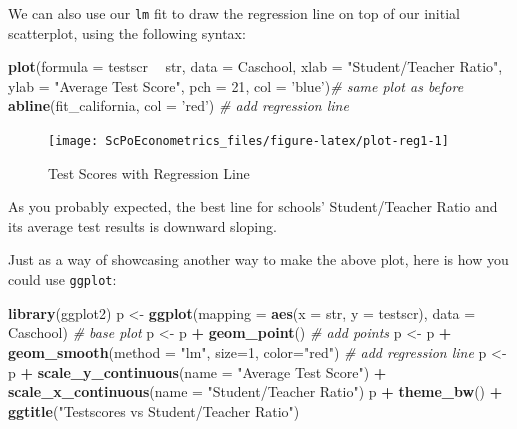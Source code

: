 \documentclass[]{book}
\newenvironment{Shaded}{\begin{snugshade}}{\end{snugshade}}
\newcommand{\KeywordTok}[1]{\textcolor[rgb]{0.13,0.29,0.53}{\textbf{#1}}}
\newcommand{\DataTypeTok}[1]{\textcolor[rgb]{0.13,0.29,0.53}{#1}}
\newcommand{\DecValTok}[1]{\textcolor[rgb]{0.00,0.00,0.81}{#1}}
\newcommand{\StringTok}[1]{\textcolor[rgb]{0.31,0.60,0.02}{#1}}
\newcommand{\CommentTok}[1]{\textcolor[rgb]{0.56,0.35,0.01}{\textit{#1}}}
\newcommand{\OperatorTok}[1]{\textcolor[rgb]{0.81,0.36,0.00}{\textbf{#1}}}
\newcommand{\NormalTok}[1]{#1}
\theoremstyle{definition}
\theoremstyle{definition}
\theoremstyle{definition}
\theoremstyle{remark}
\begin{document}
We can also use our \texttt{lm} fit to draw the regression line on top
of our initial scatterplot, using the following syntax:

\begin{Shaded}
\begin{Highlighting}[]
\KeywordTok{plot}\NormalTok{(}\DataTypeTok{formula =}\NormalTok{ testscr }\OperatorTok{~}\StringTok{ }\NormalTok{str,}
     \DataTypeTok{data =}\NormalTok{ Caschool,}
     \DataTypeTok{xlab =} \StringTok{"Student/Teacher Ratio"}\NormalTok{,}
     \DataTypeTok{ylab =} \StringTok{"Average Test Score"}\NormalTok{, }\DataTypeTok{pch =} \DecValTok{21}\NormalTok{, }\DataTypeTok{col =} \StringTok{'blue'}\NormalTok{)}\CommentTok{# same plot as before}
\KeywordTok{abline}\NormalTok{(fit_california, }\DataTypeTok{col =} \StringTok{'red'}\NormalTok{) }\CommentTok{# add regression line}
\end{Highlighting}
\end{Shaded}

\begin{figure}

{\centering \texttt{[image: ScPoEconometrics\_files/figure-latex/plot-reg1-1]} 

}

\caption{Test Scores with Regression Line}\label{fig:plot-reg1}
\end{figure}

As you probably expected, the best line for schools' Student/Teacher
Ratio and its average test results is downward sloping.

Just as a way of showcasing another way to make the above plot, here is
how you could use \texttt{ggplot}:

\begin{Shaded}
\begin{Highlighting}[]
\KeywordTok{library}\NormalTok{(ggplot2)}
\NormalTok{p <-}\StringTok{ }\KeywordTok{ggplot}\NormalTok{(}\DataTypeTok{mapping =} \KeywordTok{aes}\NormalTok{(}\DataTypeTok{x =}\NormalTok{ str, }\DataTypeTok{y =}\NormalTok{ testscr), }\DataTypeTok{data =}\NormalTok{ Caschool) }\CommentTok{# base plot}
\NormalTok{p <-}\StringTok{ }\NormalTok{p }\OperatorTok{+}\StringTok{ }\KeywordTok{geom_point}\NormalTok{() }\CommentTok{# add points}
\NormalTok{p <-}\StringTok{ }\NormalTok{p }\OperatorTok{+}\StringTok{ }\KeywordTok{geom_smooth}\NormalTok{(}\DataTypeTok{method =} \StringTok{"lm"}\NormalTok{, }\DataTypeTok{size=}\DecValTok{1}\NormalTok{, }\DataTypeTok{color=}\StringTok{"red"}\NormalTok{) }\CommentTok{# add regression line}
\NormalTok{p <-}\StringTok{ }\NormalTok{p }\OperatorTok{+}\StringTok{ }\KeywordTok{scale_y_continuous}\NormalTok{(}\DataTypeTok{name =} \StringTok{"Average Test Score"}\NormalTok{) }\OperatorTok{+}\StringTok{ }
\StringTok{         }\KeywordTok{scale_x_continuous}\NormalTok{(}\DataTypeTok{name =} \StringTok{"Student/Teacher Ratio"}\NormalTok{)}
\NormalTok{p }\OperatorTok{+}\StringTok{ }\KeywordTok{theme_bw}\NormalTok{() }\OperatorTok{+}\StringTok{ }\KeywordTok{ggtitle}\NormalTok{(}\StringTok{"Testscores vs Student/Teacher Ratio"}\NormalTok{)}
\end{Highlighting}
\end{Shaded}
\end{document}
